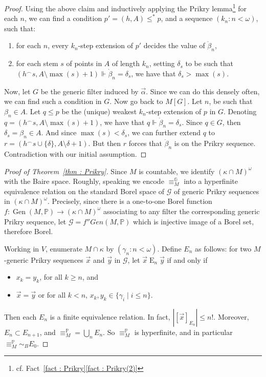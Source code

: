 \documentclass{amsart}
\newcommand{\Gen}{\operatorname{Gen}}
\newcommand{\cat}{^\frown}
\theoremstyle{definition}
\theoremstyle{remark}
\begin{document}
\begin{proof}
Using the above claim and inductively applying the Prikry lemma\footnote{cf. Fact~\ref{fact : Prikry}\ref{fact : Prikry(2)}} for each $n$, we can find a condition $p' = (h, A)\leq^*p$, and a sequence $( k_n: n<\omega)$, such that:
\begin{enumerate}
\item
for each $n$, every $k_n$-step extension of $p'$ decides the value of $\dot{\beta}_n$,
\item
for each stem $s$ of points in $A$ of length $k_n$, setting $\delta_s$ to be such that $(h\cat s, A\setminus \max(s)+1)\Vdash\dot{\beta}_n=\delta_s$, we have that $\delta_s>\max(s)$.


\end{enumerate}

Now, let $G$ be the generic filter induced by $\vec{\alpha}$.
Since we can do this densely often, we can find such a condition in  $G$. Now go back to $M[G]$. Let $n$, be such that $\beta_n\in A$. Let $q\leq p$ be the (unique) weakest $k_n$-step extension of $p$ in $G$. Denoting $q = (h\cat s, A\setminus \max(s)+1)$, we have that $q\Vdash\dot{\beta}_n=\delta_s$. Since $q\in G$, then $\delta_s=\beta_n\in A$. And since $\max(s)<\delta_s$, we can further extend $q$ to $r = (h\cat {s\cup\{\delta\}}, A\setminus \delta+1)$. But then $r$ forces that $\dot{\beta}_n$ is on the Prikry sequence. Contradiction with our initial assumption.
\end{proof}


\begin{proof}[Proof of Theorem~\ref{thm : Prikry}]
Since \(M\) is countable, we identify \((\kappa\cap M)^\omega\) with the Baire space. Roughly, speaking we encode \(\equiv^\mathbb{G}_M\) into a hyperfinite equivalence relation on the standard Borel space of \(\mathcal{G}\) of generic Prikry sequences in \((\kappa\cap M)^\omega\). Precisely, since
there is a one-to-one Borel function $f\colon\Gen(M,\mathbb{P})\rightarrow (\kappa\cap M)^\omega$ associating to any filter the corresponding generic Prikry sequence, let \(\mathcal{G} = f'' Gen(M,\mathbb{P})\) which is injective image of a Borel set, therefore Borel.

Working in $V$, enumerate $M\cap\kappa$ by $(\gamma_n: n<\omega)$.
Define $E_n$ as follows: for two $M$-generic Prikry sequences $\vec{x}$ and $\vec{y}$ in \(\mathcal{G}\), let $\vec{x}\mathbin{E}_n\vec{y}$ if and only if 
\begin{itemize}
\item
$x_k=y_k$, for all $k\geq n$, and
\item
$\vec{x}=\vec{y}$ or for all $k<n$, $x_k, y_k\in \{\gamma_i\mid i\leq n\}$.

\end{itemize}
Then each $E_n$ is a finite equivalence relation. In fact, \(|[\vec{x}]_{E_n}| \leq n!\). Moreover,  $ E_n\subset E_{n+1}$, and $\equiv_{M}^\mathbb{P} = \bigcup_n E_n$. So $\equiv_{M}^\mathbb{P}$ is hyperfinite, and in particular $\equiv_{M}^\mathbb{P}\sim_B E_0$. 
\end{proof}
\end{document}
